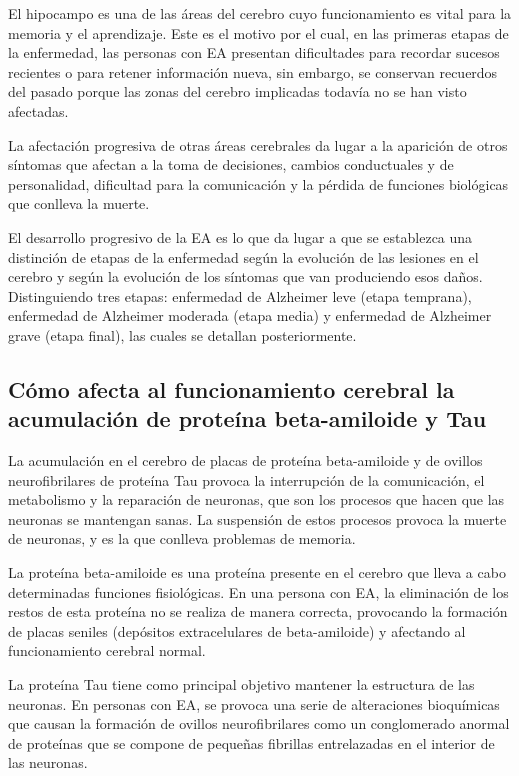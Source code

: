 El hipocampo es una de las áreas del cerebro cuyo funcionamiento es vital para la memoria y el aprendizaje.
Este es el motivo por el cual, en las primeras etapas de la enfermedad, las personas con EA presentan dificultades para
recordar sucesos recientes o para retener información nueva, sin embargo, se conservan recuerdos del pasado porque las
zonas del cerebro implicadas todavía no se han visto afectadas.

La afectación progresiva de otras áreas cerebrales da lugar a la aparición de otros síntomas que afectan a la toma de
decisiones, cambios conductuales y de personalidad, dificultad para la comunicación y la pérdida de funciones biológicas
que conlleva la muerte.

El desarrollo progresivo de la EA es lo que da lugar a que se establezca una distinción de etapas de la enfermedad según
la evolución de las lesiones en el cerebro y según la evolución de los síntomas que van produciendo esos daños.
Distinguiendo tres etapas: enfermedad de Alzheimer leve (etapa temprana), enfermedad de Alzheimer moderada (etapa media)
y enfermedad de Alzheimer grave (etapa final), las cuales se detallan posteriormente.

\subsection{Cómo afecta al funcionamiento cerebral la acumulación de proteína beta-amiloide y Tau}\label{subsec:acumulacion-proteínas}
La acumulación en el cerebro de placas de proteína beta-amiloide y de ovillos neurofibrilares de proteína Tau provoca la
interrupción de la comunicación, el metabolismo y la reparación de neuronas, que son los procesos que hacen que las
neuronas se mantengan sanas.
La suspensión de estos procesos provoca la muerte de neuronas, y es la que conlleva problemas de memoria.

La proteína beta-amiloide es una proteína presente en el cerebro que lleva a cabo determinadas funciones fisiológicas.
En una persona con EA, la eliminación de los restos de esta proteína no se realiza de manera correcta, provocando la
formación de placas seniles (depósitos extracelulares de beta-amiloide) y afectando al funcionamiento cerebral normal.


La proteína Tau tiene como principal objetivo mantener la estructura de las neuronas.
En personas con EA, se provoca una serie de alteraciones bioquímicas que causan la formación de ovillos neurofibrilares
como un conglomerado anormal de proteínas que se compone de pequeñas fibrillas entrelazadas en el interior de las
neuronas.


